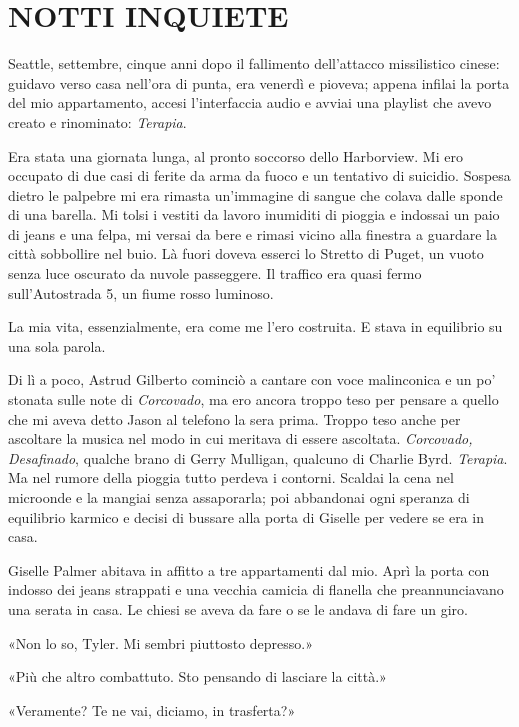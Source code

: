 \chapter{NOTTI INQUIETE}\label{notti-inquiete}

\hfill\break

Seattle, settembre, cinque anni dopo il fallimento dell'attacco
missilistico cinese: guidavo verso casa nell'ora di punta, era venerdì e
pioveva; appena infilai la porta del mio appartamento, accesi
l'interfaccia audio e avviai una playlist che avevo creato e rinominato:
\emph{Terapia}.

Era stata una giornata lunga, al pronto soccorso dello Harborview. Mi
ero occupato di due casi di ferite da arma da fuoco e un tentativo di
suicidio. Sospesa dietro le palpebre mi era rimasta un'immagine di
sangue che colava dalle sponde di una barella. Mi tolsi i vestiti da
lavoro inumiditi di pioggia e indossai un paio di jeans e una felpa, mi
versai da bere e rimasi vicino alla finestra a guardare la città
sobbollire nel buio. Là fuori doveva esserci lo Stretto di Puget, un
vuoto senza luce oscurato da nuvole passeggere. Il traffico era quasi
fermo sull'Autostrada 5, un fiume rosso luminoso.

La mia vita, essenzialmente, era come me l'ero costruita. E stava in
equilibrio su una sola parola.

Di lì a poco, Astrud Gilberto cominciò a cantare con voce malinconica e
un po' stonata sulle note di \emph{Corcovado}, ma ero ancora troppo teso
per pensare a quello che mi aveva detto Jason al telefono la sera prima.
Troppo teso anche per ascoltare la musica nel modo in cui meritava di
essere ascoltata. \emph{Corcovado, Desafinado}, qualche brano di Gerry
Mulligan, qualcuno di Charlie Byrd. \emph{Terapia}. Ma nel rumore della
pioggia tutto perdeva i contorni. Scaldai la cena nel microonde e la
mangiai senza assaporarla; poi abbandonai ogni speranza di equilibrio
karmico e decisi di bussare alla porta di Giselle per vedere se era in
casa.

Giselle Palmer abitava in affitto a tre appartamenti dal mio. Aprì la
porta con indosso dei jeans strappati e una vecchia camicia di flanella
che preannunciavano una serata in casa. Le chiesi se aveva da fare o se
le andava di fare un giro.

«Non lo so, Tyler. Mi sembri piuttosto depresso.»

«Più che altro combattuto. Sto pensando di lasciare la città.»

«Veramente? Te ne vai, diciamo, in trasferta?»

